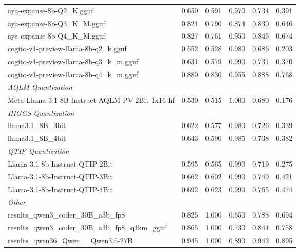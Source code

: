 \begin{table}[htbp]
{\begin{tabular}{lrrrrr}
    aya-expanse-8b-Q2\_K.gguf & 0.650 & 0.591 & 0.970 & 0.734 & 0.391 \\
    aya-expanse-8b-Q3\_K\_M.gguf & 0.821 & 0.790 & 0.874 & 0.830 & 0.646 \\
    aya-expanse-8b-Q4\_K\_M.gguf & 0.827 & 0.761 & 0.950 & 0.845 & 0.674 \\
    cogito-v1-preview-llama-8b-q2\_k.gguf & 0.552 & 0.528 & 0.980 & 0.686 & 0.203 \\
    cogito-v1-preview-llama-8b-q3\_k\_m.gguf & 0.631 & 0.579 & 0.990 & 0.731 & 0.370 \\
    cogito-v1-preview-llama-8b-q4\_k\_m.gguf & 0.880 & 0.830 & 0.955 & 0.888 & 0.768 \\
    \midrule
    \multicolumn{6}{l}{\textit{AQLM Quantization}} \\
    \midrule
    Meta-Llama-3.1-8B-Instruct-AQLM-PV-2Bit-1x16-hf & 0.530 & 0.515 & 1.000 & 0.680 & 0.176 \\
    \midrule
    \multicolumn{6}{l}{\textit{HIGGS Quantization}} \\
    \midrule
    llama3.1\_8B\_3bit & 0.622 & 0.577 & 0.980 & 0.726 & 0.339 \\
    llama3.1\_8B\_4bit & 0.643 & 0.590 & 0.985 & 0.738 & 0.382 \\
    \midrule
    \multicolumn{6}{l}{\textit{QTIP Quantization}} \\
    \midrule
    Llama-3.1-8b-Instruct-QTIP-2Bit & 0.595 & 0.565 & 0.990 & 0.719 & 0.275 \\
    Llama-3.1-8b-Instruct-QTIP-3Bit & 0.662 & 0.602 & 0.990 & 0.749 & 0.421 \\
    Llama-3.1-8b-Instruct-QTIP-4Bit & 0.692 & 0.623 & 0.990 & 0.765 & 0.474 \\
    \midrule
    \multicolumn{6}{l}{\textit{Other}} \\
    \midrule
    results\_qwen3\_coder\_30B\_a3b\_fp8 & 0.825 & 1.000 & 0.650 & 0.788 & 0.694 \\
    results\_qwen3\_coder\_30B\_a3b\_fp8\_q4km\_gguf & 0.865 & 1.000 & 0.730 & 0.844 & 0.758 \\
    results\_qwen36\_Qwen\_\_Qwen3.6-27B & 0.945 & 1.000 & 0.890 & 0.942 & 0.895 \\
    \bottomrule
  \end{tabular}
  }
\end{table}

